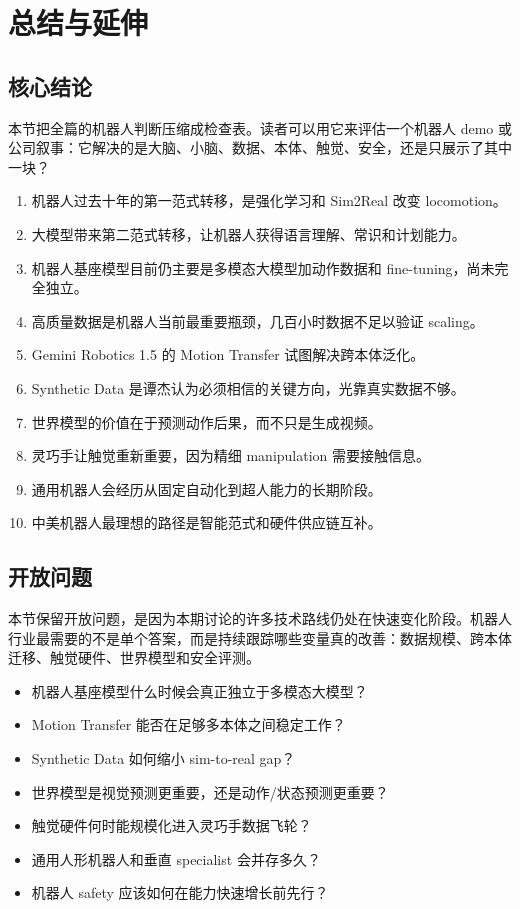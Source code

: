 \section{总结与延伸}

\subsection{核心结论}

本节把全篇的机器人判断压缩成检查表。读者可以用它来评估一个机器人 demo 或公司叙事：它解决的是大脑、小脑、数据、本体、触觉、安全，还是只展示了其中一块？

\begin{enumerate}
\item 机器人过去十年的第一范式转移，是强化学习和 Sim2Real 改变 locomotion。
\item 大模型带来第二范式转移，让机器人获得语言理解、常识和计划能力。
\item 机器人基座模型目前仍主要是多模态大模型加动作数据和 fine-tuning，尚未完全独立。
\item 高质量数据是机器人当前最重要瓶颈，几百小时数据不足以验证 scaling。
\item Gemini Robotics 1.5 的 Motion Transfer 试图解决跨本体泛化。
\item Synthetic Data 是谭杰认为必须相信的关键方向，光靠真实数据不够。
\item 世界模型的价值在于预测动作后果，而不只是生成视频。
\item 灵巧手让触觉重新重要，因为精细 manipulation 需要接触信息。
\item 通用机器人会经历从固定自动化到超人能力的长期阶段。
\item 中美机器人最理想的路径是智能范式和硬件供应链互补。
\end{enumerate}

\subsection{开放问题}

本节保留开放问题，是因为本期讨论的许多技术路线仍处在快速变化阶段。机器人行业最需要的不是单个答案，而是持续跟踪哪些变量真的改善：数据规模、跨本体迁移、触觉硬件、世界模型和安全评测。

\begin{itemize}
\item 机器人基座模型什么时候会真正独立于多模态大模型？
\item Motion Transfer 能否在足够多本体之间稳定工作？
\item Synthetic Data 如何缩小 sim-to-real gap？
\item 世界模型是视觉预测更重要，还是动作/状态预测更重要？
\item 触觉硬件何时能规模化进入灵巧手数据飞轮？
\item 通用人形机器人和垂直 specialist 会并存多久？
\item 机器人 safety 应该如何在能力快速增长前先行？
\end{itemize}


